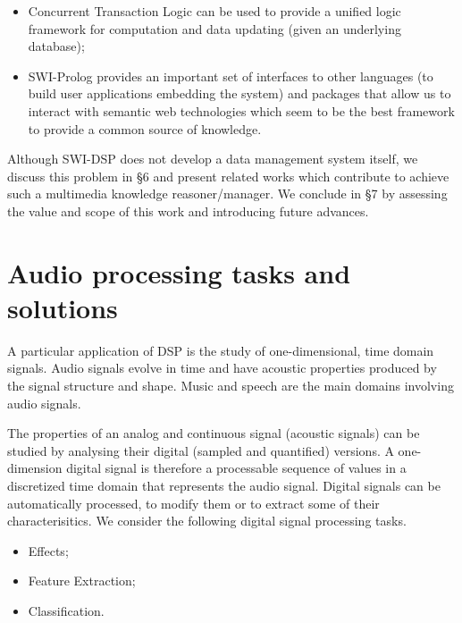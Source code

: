 \documentclass[runningheads]{llncs}
\begin{document}
\begin{itemize}
 \item Concurrent Transaction Logic can be used to provide a unified logic framework for computation and data updating (given an underlying database);
 \item SWI-Prolog provides an important set of interfaces to other languages (to build user applications embedding the system) and packages that allow us to interact with semantic web technologies which seem to be the best framework to provide a common source of knowledge.
\end{itemize}

Although SWI-DSP does not develop a data management system itself, we discuss this problem in \S 6 and present related works which contribute to achieve such a multimedia knowledge reasoner/manager. We conclude in \S 7 by assessing the value and scope of this work and introducing future advances.

\section{Audio processing tasks and solutions}\label{sec:tasks}

A particular application of DSP is the study of one-dimensional, time domain signals.  %
Audio signals evolve in time and have acoustic properties produced by the signal structure and shape. Music and speech are the main domains involving audio signals.

The properties of an analog and continuous signal (acoustic signals) can be studied by analysing their digital (sampled and quantified) versions. A one-dimension digital signal is therefore a processable sequence of values in a discretized time domain that represents the audio signal. Digital signals can be automatically processed, to modify them or to extract some of their characterisitics. 
We consider the following digital signal processing tasks.

\begin{itemize}
 \item Effects;
 \item Feature Extraction;
 \item Classification.
\end{itemize}
\end{document}
